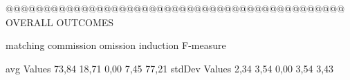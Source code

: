  @@@@@@@@@@@@@@@@@@@@@@@@@@@@@@@@@@@@@@@@@@@@@ OVERALL OUTCOMES

                matching commission   omission  induction  F-measure
      
avg Values      73,84      18,71       0,00      7,45    77,21      
stdDev Values    2,34       3,54       0,00       3,54    3,43       
